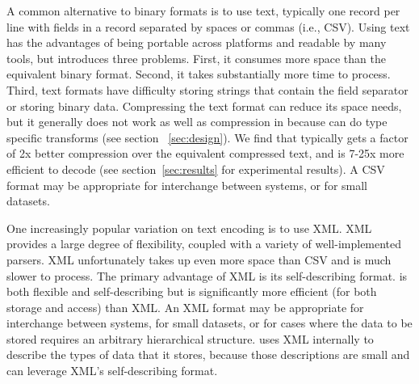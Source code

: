 A common alternative to binary formats is to use text, typically one
record per line with fields in a record separated by spaces or commas
(i.e., CSV). Using text has the advantages of being portable across
platforms and readable by many tools, but introduces three problems.
First, it consumes more space than the equivalent binary format.
Second, it takes substantially more time to process.  Third, text
formats have difficulty storing strings that contain the field
separator or storing binary data.
Compressing the text format can reduce its space needs, but it
generally does not work as well as compression in \DataSeries{} because 
\DataSeries{} can do type specific transforms (see section ~\ref{sec:design}).
We find that
\DataSeries{} typically gets a factor of 2x better compression over the
equivalent compressed text, and is 7-25x more efficient to decode (see
section~\ref{sec:results} for experimental results).  A CSV format may be
appropriate for interchange between systems, or for small datasets.

One increasingly popular variation on text encoding is to use XML. XML
provides a large degree of flexibility, coupled with a variety of
well-implemented parsers.  XML unfortunately takes up even more space than
CSV and is much slower to process.
The primary advantage of XML 
is its self-describing format.
\DataSeries{} is both flexible and self-describing 
but is significantly more
efficient (for both storage and access) than XML. An XML format may 
be appropriate for interchange between systems, for small datasets, or for
cases where the data to be stored requires an arbitrary hierarchical structure.
\DataSeries{} uses XML internally to describe the types of 
data that it stores, because those descriptions are small
and can leverage XML's self-describing format.

